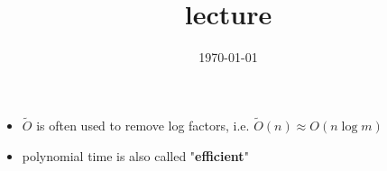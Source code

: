 \documentclass{article}
\title{lecture}
\date{\today}
\begin{document}
\maketitle




\begin{itemize}
    \item \(\tilde{O}\) is often used to remove log factors, i.e. \(\tilde{O}(n)\approx O(n\log m)\)
    \item polynomial time is also called "\textbf{efficient}"
\end{itemize}
\end{document}
